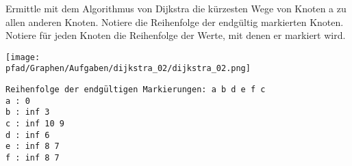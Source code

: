 ﻿\question[6]
Ermittle mit dem Algorithmus von Dijkstra die kürzesten Wege von Knoten a zu allen anderen
Knoten.  Notiere die Reihenfolge der endgültig markierten Knoten.
Notiere für jeden Knoten die Reihenfolge der Werte, mit denen er markiert wird.

\texttt{[image: \\pfad/Graphen/Aufgaben/dijkstra\_02/dijkstra\_02.png]}
\begin{solutionbox}{5cm}
\begin{lstlisting}
Reihenfolge der endgültigen Markierungen: a b d e f c
a : 0
b : inf 3
c : inf 10 9
d : inf 6
e : inf 8 7
f : inf 8 7
\end{lstlisting}
\end{solutionbox}
